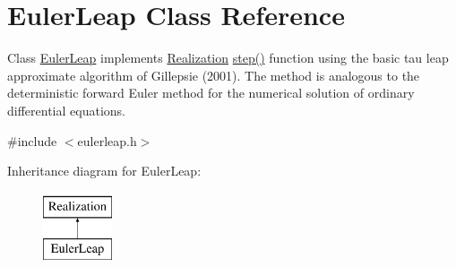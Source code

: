\hypertarget{class_euler_leap}{}\section{Euler\+Leap Class Reference}
\label{class_euler_leap}


Class \hyperlink{class_euler_leap}{Euler\+Leap} implements \hyperlink{class_realization}{Realization} \hyperlink{class_euler_leap_a25b1ea90a95bfd41ecb919605683da9d}{step()} function using the basic tau leap approximate algorithm of Gillepsie (2001). The method is analogous to the deterministic forward Euler method for the numerical solution of ordinary differential equations.  




{\ttfamily \#include $<$eulerleap.\+h$>$}

Inheritance diagram for Euler\+Leap\+:\begin{figure}[H]
\begin{center}
\leavevmode
\includegraphics[height=2.000000cm]{class_euler_leap}
\end{center}
\end{figure}
